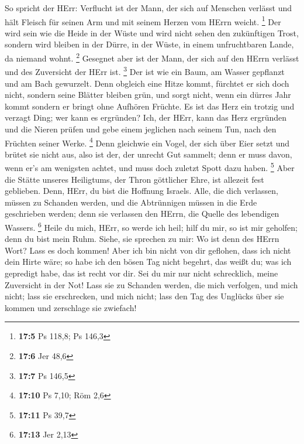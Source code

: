  So spricht der HErr: Verflucht ist der Mann, der sich auf
Menschen verlässt und hält Fleisch für seinen Arm und mit seinem Herzen
vom HErrn weicht. \footnote{\textbf{17:5} Ps 118,8; Ps 146,3}
 Der wird sein wie die Heide in der Wüste und wird nicht
sehen den zukünftigen Trost, sondern wird bleiben in der Dürre, in der
Wüste, in einem unfruchtbaren Lande, da niemand wohnt. \footnote{\textbf{17:6}
  Jer 48,6}  Gesegnet aber ist der Mann, der sich auf den
HErrn verlässt und des Zuversicht der HErr ist. \footnote{\textbf{17:7}
  Ps 146,5}  Der ist wie ein Baum, am Wasser gepflanzt und
am Bach gewurzelt. Denn obgleich eine Hitze kommt, fürchtet er sich doch
nicht, sondern seine Blätter bleiben grün, und sorgt nicht, wenn ein
dürres Jahr kommt sondern er bringt ohne Aufhören Früchte. 
Es ist das Herz ein trotzig und verzagt Ding; wer kann es ergründen?
 Ich, der HErr, kann das Herz ergründen und die Nieren
prüfen und gebe einem jeglichen nach seinem Tun, nach den Früchten
seiner Werke. \footnote{\textbf{17:10} Ps 7,10; Röm 2,6} 
Denn gleichwie ein Vogel, der sich über Eier setzt und brütet sie nicht
aus, also ist der, der unrecht Gut sammelt; denn er muss davon, wenn
er's am wenigsten achtet, und muss doch zuletzt Spott dazu haben.
\footnote{\textbf{17:11} Ps 39,7}  Aber die Stätte unseres
Heiligtums, der Thron göttlicher Ehre, ist allezeit fest geblieben.
 Denn, HErr, du bist die Hoffnung Israels. Alle, die dich
verlassen, müssen zu Schanden werden, und die Abtrünnigen müssen in die
Erde geschrieben werden; denn sie verlassen den HErrn, die Quelle des
lebendigen Wassers. \footnote{\textbf{17:13} Jer 2,13} 
Heile du mich, HErr, so werde ich heil; hilf du mir, so ist mir
geholfen; denn du bist mein Ruhm.  Siehe, sie sprechen zu
mir: Wo ist denn des HErrn Wort? Lass es doch kommen!  Aber
ich bin nicht von dir geflohen, dass ich nicht dein Hirte wäre; so habe
ich den bösen Tag nicht begehrt, das weißt du; was ich gepredigt habe,
das ist recht vor dir.  Sei du mir nur nicht schrecklich,
meine Zuversicht in der Not!  Lass sie zu Schanden werden,
die mich verfolgen, und mich nicht; lass sie erschrecken, und mich
nicht; lass den Tag des Unglücks über sie kommen und zerschlage sie
zwiefach!

